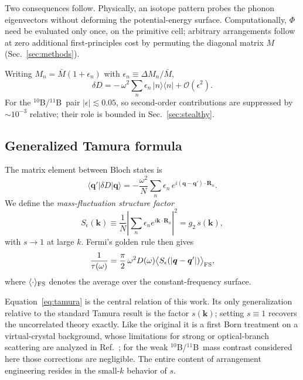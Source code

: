 \documentclass[
  aps,
  prl,
  reprint,
  amsmath,
  amssymb,
  superscriptaddress,
  floatfix,
  nofootinbib
]{revtex4-2}
\newcommand{\tenB}{$^{10}$B}
\newcommand{\elevenB}{$^{11}$B}
\begin{document}
Two consequences follow. Physically, an isotope pattern probes the phonon
eigenvectors without deforming the potential-energy surface. Computationally,
$\Phi$ need be evaluated only once, on the primitive cell; arbitrary
arrangements follow at zero additional first-principles cost by permuting the
diagonal matrix $M$ (Sec.~\ref{sec:methods}).

Writing $M_n=\bar M(1+\epsilon_n)$ with $\epsilon_n\equiv\Delta M_n/\bar M$,
\begin{equation}
  \delta D = -\,\omega^{2}\sum_n \epsilon_n\,|n\rangle\langle n|
             + \mathcal{O}(\epsilon^{2}).
  \label{eq:deltaD}
\end{equation}
For the \tenB/\elevenB\ pair $|\epsilon|\lesssim0.05$, so second-order
contributions are suppressed by $\sim10^{-3}$ relative; their role is bounded
in Sec.~\ref{sec:stealthy}.

\subsection{Generalized Tamura formula}

The matrix element between Bloch states is
\begin{equation}
  \langle\bm q'|\delta D|\bm q\rangle
    = -\frac{\omega^{2}}{N}\sum_n \epsilon_n\,
      e^{i(\bm q-\bm q')\cdot\bm R_n}.
  \label{eq:matelem}
\end{equation}
We define the \emph{mass-fluctuation structure factor}
\begin{equation}
  S_\epsilon(\bm k)\equiv
    \frac{1}{N}\left|\sum_n \epsilon_n e^{i\bm k\cdot\bm R_n}\right|^{2}
    = g_2\,s(\bm k),
  \label{eq:Seps}
\end{equation}
with $s\to1$ at large $k$. Fermi's golden rule then gives
\begin{equation}
  \frac{1}{\tau(\omega)}
    = \frac{\pi}{2}\,\omega^{2}D(\omega)
      \big\langle S_\epsilon(|\bm q-\bm q'|)\big\rangle_{\rm FS},
  \label{eq:tamura}
\end{equation}
where $\langle\cdot\rangle_{\rm FS}$ denotes the average over the
constant-frequency surface.

Equation~\eqref{eq:tamura} is the central relation of this work. Its only
generalization relative to the standard Tamura result is the factor
$s(\bm k)$; setting $s\equiv1$ recovers the uncorrelated theory exactly. Like
the original it is a first Born treatment on a virtual-crystal background,
whose limitations for strong or optical-branch scattering are analyzed in
Ref.~\cite{Protik2024}; for the weak \tenB/\elevenB\ mass contrast considered
here those corrections are negligible. The
entire content of arrangement engineering resides in the small-$k$ behavior of
$s$.
\end{document}
